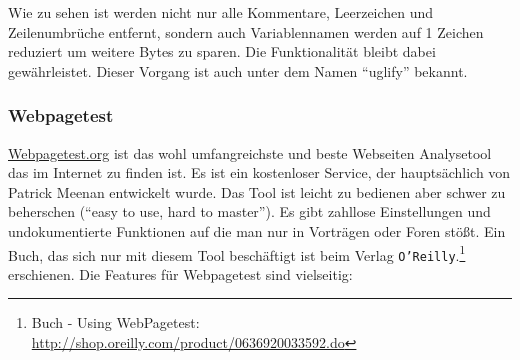 			Wie zu sehen ist werden nicht nur alle Kommentare, Leerzeichen und Zeilenumbrüche entfernt, sondern auch Variablennamen werden auf 1 Zeichen reduziert um weitere Bytes zu sparen. Die Funktionalität bleibt dabei gewährleistet. Dieser Vorgang ist auch unter dem Namen "`uglify"' bekannt.
		

		\subsubsection{Webpagetest} %
		\label{ssub:webpagetest}
			\url{Webpagetest.org} ist das wohl umfangreichste und beste Webseiten Analysetool das im Internet zu finden ist. Es ist ein kostenloser Service, der hauptsächlich von Patrick Meenan entwickelt wurde. Das Tool ist leicht zu bedienen aber schwer zu beherschen ("`easy to use, hard to master"'). Es gibt zahllose Einstellungen und undokumentierte Funktionen auf die man nur in Vorträgen oder Foren stößt. Ein Buch, das sich nur mit diesem Tool beschäftigt ist beim Verlag \texttt{O'Reilly}.\footnote{Buch - Using WebPagetest: \url{http://shop.oreilly.com/product/0636920033592.do}} erschienen.	Die Features für Webpagetest sind vielseitig:


